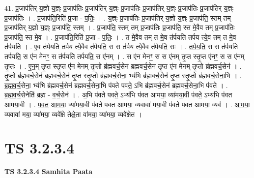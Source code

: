\documentclass[17pt]{extarticle}
\begin{document}
41. प्र॒जाप॑तिर् य॒ज्ञो य॒ज्ञ्ः प्र॒जाप॑तिः प्र॒जाप॑तिर् य॒ज्ञ्ः प्र॒जाप॑तिः प्र॒जाप॑तिर् य॒ज्ञ्ः प्र॒जाप॑तिः प्र॒जाप॑तिर् य॒ज्ञ्ः प्र॒जाप॑तिः । . प्र॒जाप॑ति॒रिति॑ प्र॒जा - प॒तिः॒ । . य॒ज्ञ्ः प्र॒जाप॑तिः प्र॒जाप॑तिर् य॒ज्ञो य॒ज्ञ्ः प्र॒जाप॑ति॒ स्तम् तम् प्र॒जाप॑तिर् य॒ज्ञो य॒ज्ञ्ः प्र॒जाप॑ति॒ स्तम् । . प्र॒जाप॑ति॒ स्तम् तम् प्र॒जाप॑तिः प्र॒जाप॑ति॒ स्त मे॒वैव तम् प्र॒जाप॑तिः प्र॒जाप॑ति॒ स्त मे॒व । . प्र॒जाप॑ति॒रिति॑ प्र॒जा - प॒तिः॒ । . त मे॒वैव तम् त मे॒व त॑र्पयति तर्पय त्ये॒व तम् त मे॒व त॑र्पयति । . ए॒व त॑र्पयति तर्पय त्ये॒वैव त॑र्पयति॒ स स त॑र्पय त्ये॒वैव त॑र्पयति॒ सः । . त॒र्प॒य॒ति॒ स स त॑र्पयति तर्पयति॒ स ए॑न मेनꣳ॒॒ स त॑र्पयति तर्पयति॒ स ए॑नम् । . स ए॑न मेनꣳ॒॒ स स ए॑नम् तृ॒प्त स्तृ॒प्त ए॑नꣳ॒॒ स स ए॑नम् तृ॒प्तः । . ए॒न॒म् तृ॒प्त स्तृ॒प्त ए॑न मेनम् तृ॒प्तो ब्र॑ह्मवर्च॒सेन॑ ब्रह्मवर्च॒सेन॑ तृ॒प्त ए॑न मेनम् तृ॒प्तो ब्र॑ह्मवर्च॒सेन॑ । . तृ॒प्तो ब्र॑ह्मवर्च॒सेन॑ ब्रह्मवर्च॒सेन॑ तृ॒प्त स्तृ॒प्तो ब्र॑ह्मवर्च॒सेना॒ भ्य॑भि ब्र॑ह्मवर्च॒सेन॑ तृ॒प्त स्तृ॒प्तो ब्र॑ह्मवर्च॒सेना॒भि । . ब्र॒ह्म॒व॒र्च॒सेना॒ भ्य॑भि ब्र॑ह्मवर्च॒सेन॑ ब्रह्मवर्च॒सेना॒भि प॑वते पवते॒ ऽभि ब्र॑ह्मवर्च॒सेन॑ ब्रह्मवर्च॒सेना॒भि प॑वते । . ब्र॒ह्म॒व॒र्च॒सेनेति॑ ब्रह्म - व॒र्च॒सेन॑ । . अ॒भि प॑वते पवते॒ ऽभ्य॑भि प॑वत आमया॒ व्या॑मया॒वी प॑वते॒ ऽभ्य॑भि प॑वत आमया॒वी । . प॒व॒त॒ आ॒म॒या॒ व्या॑मया॒वी प॑वते पवत आमया॒ व्यवावा॑ मया॒वी प॑वते पवत आमया॒ व्यव॑ । . आ॒म॒या॒ व्यवावा॑ मया॒ व्या॑मया॒ व्यवे᳚क्षे तेक्षे॒ता वा॑मया॒ व्या॑मया॒ व्यवे᳚क्षेत । \newline
\pagebreak
{}

\section{ TS 3.2.3.4 }

\textbf{TS 3.2.3.4 } \newline
\textbf{Samhita Paata} \newline
\end{document}
